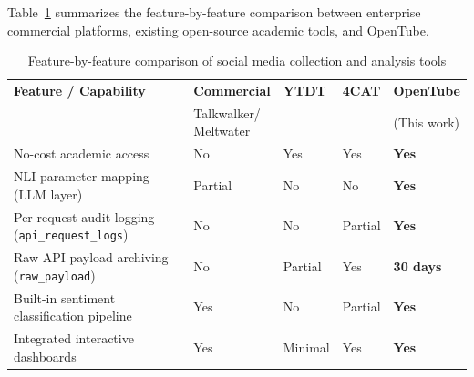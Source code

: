 Table~\ref{tab:tool_comparison} summarizes the feature-by-feature comparison between enterprise commercial platforms, existing open-source academic tools, and OpenTube.

\begin{table}[htbp]
    \centering
    \scriptsize
    \caption{Feature-by-feature comparison of social media collection and analysis tools}
    \label{tab:tool_comparison}
    \begin{tabularx}{\textwidth}{>{\raggedright\arraybackslash}X >{\centering\arraybackslash}X >{\centering\arraybackslash}X >{\centering\arraybackslash}X >{\centering\arraybackslash}X}
        \toprule
        \textbf{Feature / Capability}                           & \textbf{Commercial}    & \textbf{YTDT}                 & \textbf{4CAT}              & \textbf{OpenTube} \\
                                                                & \shortstack{Talkwalker/\\Meltwater} & \autocite{youtube_data_tools} & \autocite{peeters20224cat} & (This work)       \\
        \midrule
        No-cost academic access                                 & No                     & Yes                           & Yes                        & \textbf{Yes}      \\
        NLI parameter mapping (LLM layer)                       & Partial                & No                            & No                         & \textbf{Yes}      \\
        Per-request audit logging (\texttt{api\_request\_logs}) & No                     & No                            & Partial                    & \textbf{Yes}      \\
        Raw API payload archiving (\texttt{raw\_payload})       & No                     & Partial                       & Yes                        & \textbf{30 days}  \\
        Built-in sentiment classification pipeline              & Yes                    & No                            & Partial                    & \textbf{Yes}      \\
        Integrated interactive dashboards                       & Yes                    & Minimal                       & Yes                        & \textbf{Yes}      \\
        \bottomrule
    \end{tabularx}
\end{table}

